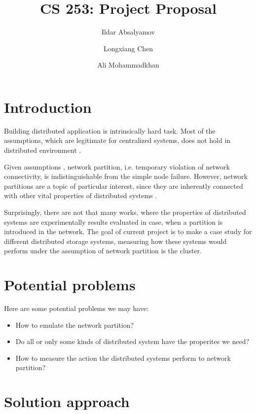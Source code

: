 \documentclass[a4paper]{article}
\title{CS 253: Project Proposal}
\author{Ildar Absalyamov \and Longxiang Chen \and Ali Mohammadkhan}
\begin{document}
\maketitle

\section*{Introduction}

Building distributed application is intrinsically hard task.
Most of the assumptions, which are legitimate for centralized systems, does not hold in distributed environment \cite{deutsch1992eight}.

Given assumptions \cite{deutsch1992eight}, network partition, i.e. temporary violation of network connectivity, is indistinguishable from the simple node failure. 
However, network partitions are a topic of particular interest, since they are inherently connected with other vital properties of distributed systems \cite{brewer2000towards}.

Surprisingly, there are not that many works, where the properties of distributed systems are experimentally results evaluated in case, when a partition is introduced in the network.
The goal of current project is to make a case study for different distributed storage systems, measuring how these systems would perform under the assumption of network partition is the cluster.

\section*{Potential problems}

Here are some potential problems we may have:

\begin{itemize}
  \item How to emulate the network partition?
  \item Do all or only some kinds of distributed system have the properites we need?
  \item How to measure the action the distributed systems perform to network partition?
\end{itemize} 

\section*{Solution approach}
\end{document}
